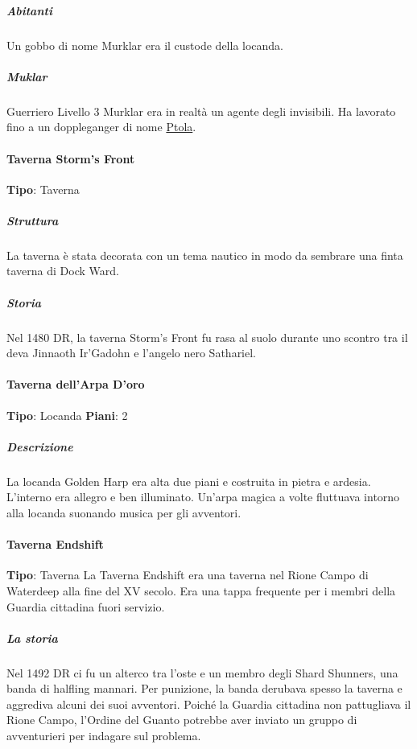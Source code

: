 \documentclass{article}
\begin{document}
                      \subparagraph{Abitanti}
                      Un gobbo di nome Murklar era il custode della locanda.
                      \subparagraph{Muklar}
                      Guerriero Livello 3 \newline Murklar era in realtà un agente degli invisibili. Ha lavorato fino a un doppleganger di nome \href{https://forgottenrealms.fandom.com/wiki/Ptola}{Ptola}.
                  \paragraph{Taverna Storm's Front}
                  \textbf{Tipo}: Taverna
                      \subparagraph{Struttura}
                      La taverna è stata decorata con un tema nautico in modo da sembrare una finta taverna di Dock Ward.

                      \subparagraph{Storia}
                      Nel 1480 DR, la taverna Storm's Front fu rasa al suolo durante uno scontro tra il deva Jinnaoth Ir'Gadohn e l'angelo nero Sathariel.

                  \paragraph{Taverna dell'Arpa D'oro}
                  \textbf{Tipo}: Locanda
                  \textbf{Piani}: 2
                      \subparagraph{Descrizione}
                        La locanda Golden Harp era alta due piani e costruita in pietra e ardesia. L'interno era allegro e ben illuminato. Un'arpa magica a volte fluttuava intorno alla locanda suonando musica per gli avventori.
                  \paragraph{Taverna Endshift}
                  \textbf{Tipo}: Taverna
                    La Taverna Endshift era una taverna nel Rione Campo di Waterdeep alla fine del XV secolo. Era una tappa frequente per i membri della Guardia cittadina fuori servizio.

                      \subparagraph{La storia}
                      Nel 1492 DR ci fu un alterco tra l'oste e un membro degli Shard Shunners, una banda di halfling mannari. Per punizione, la banda derubava spesso la taverna e aggrediva alcuni dei suoi avventori. Poiché la Guardia cittadina non pattugliava il Rione Campo, l'Ordine del Guanto potrebbe aver inviato un gruppo di avventurieri per indagare sul problema.
\end{document}
